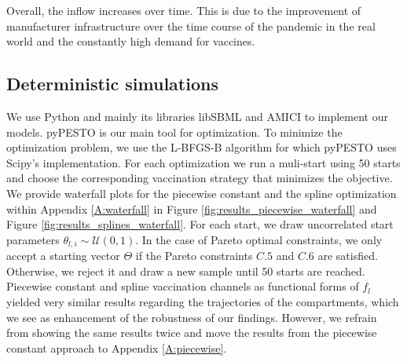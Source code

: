 Overall, the inflow increases over time. This is due to the improvement of manufacturer infrastructure over the time course of the pandemic in the real world and the constantly high demand for vaccines.


\subsection{Deterministic simulations}
We use Python and mainly its libraries libSBML \citep{Bornstein.2008} and AMICI \citep{Frohlich.2021} to implement our models. pyPESTO \citep{pyPESTO} is our main tool for optimization. To minimize the optimization problem, we use the L-BFGS-B algorithm \citep{Zhu.1997} for which pyPESTO uses Scipy's \citep{scipy.2020} implementation. For each optimization we run a muli-start using 50 starts and choose the corresponding vaccination strategy that minimizes the objective. We provide waterfall plots for the piecewise constant and the spline optimization within Appendix \ref{A:waterfall} in Figure \ref{fig:results_piecewise_waterfall} and Figure \ref{fig:results_splines_waterfall}. For each start, we draw uncorrelated start parameters $\theta_{l,i} \sim \mathcal{U}(0,1)$. In the case of Pareto optimal constraints, we only accept a starting vector $\Theta$ if the Pareto constraints $C.5$ and $C.6$ are satisfied. Otherwise, we reject it and draw a new sample until 50 starts are reached.\\

Piecewise constant and spline vaccination channels as functional forms of $f_l$ yielded very similar results regarding the trajectories of the compartments, which we see as enhancement of the robustness of our findings. However, we refrain from showing the same results twice and move the results from the piecewise constant approach to Appendix \ref{A:piecewise}.  \\

